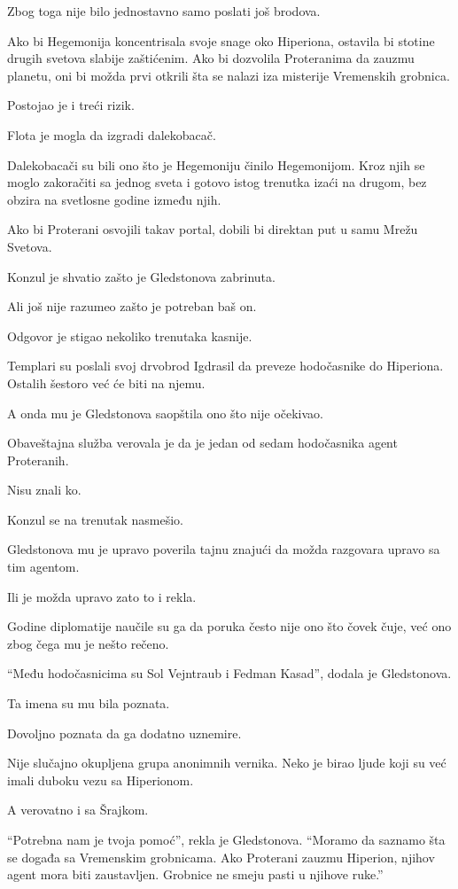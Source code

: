 Zbog toga nije bilo jednostavno samo poslati još brodova.

Ako bi Hegemonija koncentrisala svoje snage oko Hiperiona, ostavila bi stotine drugih svetova slabije zaštićenim. Ako bi dozvolila Proteranima da zauzmu planetu, oni bi možda prvi otkrili šta se nalazi iza misterije Vremenskih grobnica.

Postojao je i treći rizik.

Flota je mogla da izgradi dalekobacač.

Dalekobacači su bili ono što je Hegemoniju činilo Hegemonijom. Kroz njih se moglo zakoračiti sa jednog sveta i gotovo istog trenutka izaći na drugom, bez obzira na svetlosne godine između njih.

Ako bi Proterani osvojili takav portal, dobili bi direktan put u samu Mrežu Svetova.

Konzul je shvatio zašto je Gledstonova zabrinuta.

Ali još nije razumeo zašto je potreban baš on.

Odgovor je stigao nekoliko trenutaka kasnije.

Templari su poslali svoj drvobrod Igdrasil da preveze hodočasnike do Hiperiona. Ostalih šestoro već će biti na njemu.

A onda mu je Gledstonova saopštila ono što nije očekivao.

Obaveštajna služba verovala je da je jedan od sedam hodočasnika agent Proteranih.

Nisu znali ko.

Konzul se na trenutak nasmešio.

Gledstonova mu je upravo poverila tajnu znajući da možda razgovara upravo sa tim agentom.

Ili je možda upravo zato to i rekla.

Godine diplomatije naučile su ga da poruka često nije ono što čovek čuje, već ono zbog čega mu je nešto rečeno.

``Među hodočasnicima su Sol Vejntraub i Fedman Kasad'', dodala je Gledstonova.

Ta imena su mu bila poznata.

Dovoljno poznata da ga dodatno uznemire.

Nije slučajno okupljena grupa anonimnih vernika. Neko je birao ljude koji su već imali duboku vezu sa Hiperionom.

A verovatno i sa Šrajkom.

``Potrebna nam je tvoja pomoć'', rekla je Gledstonova. ``Moramo da saznamo šta se događa sa Vremenskim grobnicama. Ako Proterani zauzmu Hiperion, njihov agent mora biti zaustavljen. Grobnice ne smeju pasti u njihove ruke.''

